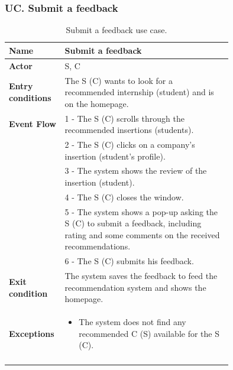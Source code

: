 \subsubsection*{UC\cuc . Submit a feedback}
\begin{center}
    \begin{longtable}{|l|p{0.75\linewidth}|}
        \hline
        \textbf{Name}               & Submit a feedback\\
        \hline
        \textbf{Actor}              & S, C\\
        \hline
        \textbf{Entry conditions}   & The S (C) wants to look for a recommended internship (student) and is on the homepage.\\
        \hline
        \textbf{Event Flow}         & 1 - The S (C) scrolls through the recommended insertions (students). \\
        & 2 - The S (C) clicks on a company’s insertion (student’s profile). \\
        & 3 - The system shows the review of the insertion (student). \\
        & 4 - The S (C) closes the window. \\
        & 5 - The system shows a pop-up asking the S (C) to submit a feedback, including rating and some comments on the received recommendations. \\
        & 6 - The S (C) submits his feedback. \\
        \hline
        \textbf{Exit condition}   & The system saves the feedback to feed the recommendation system and shows the homepage. \\       
        \hline
        \textbf{Exceptions}       & \begin{itemize}
            \item The system does not find any recommended C (S) available for the S (C).
        \end{itemize}\\
        \hline
        \caption{Submit a feedback use case.}
        \label{tab: submit_feedback_use_case}
    \end{longtable}
\end{center}


